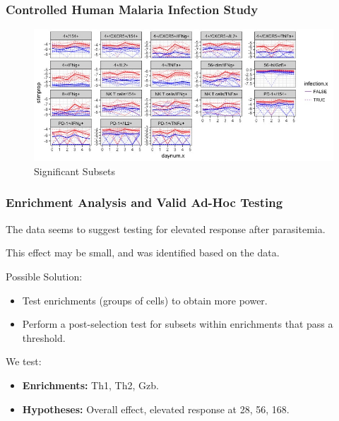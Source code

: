 \documentclass{beamer}
\theoremstyle{definition}
\begin{document}

\begin{frame}
\frametitle{Controlled Human Malaria Infection Study}
\begin{figure}[]
\includegraphics[width=13 cm]{figures/MalariaSignificantAt10} \caption{Significant Subsets}
\end{figure}
\end{frame}


\begin{frame}
\frametitle{Enrichment Analysis and Valid Ad-Hoc Testing}
The data seems to suggest testing for elevated response after parasitemia. 
\vspace{0.4 cm}

This effect may be small, and was identified based on the data.

\pause
\vspace{0.4 cm}
Possible Solution:
\begin{itemize}
\item Test enrichments (groups of cells) to obtain more power. 
\item Perform a post-selection test for subsets within enrichments that pass a threshold.
\end{itemize}

\pause
\vspace{0.4 cm}
We test:
\begin{itemize}
\item \textbf{Enrichments:} Th1, Th2, Gzb.
\item \textbf{Hypotheses:} Overall effect, elevated response at 28, 56, 168.
\end{itemize}
\end{frame}

\end{document}
